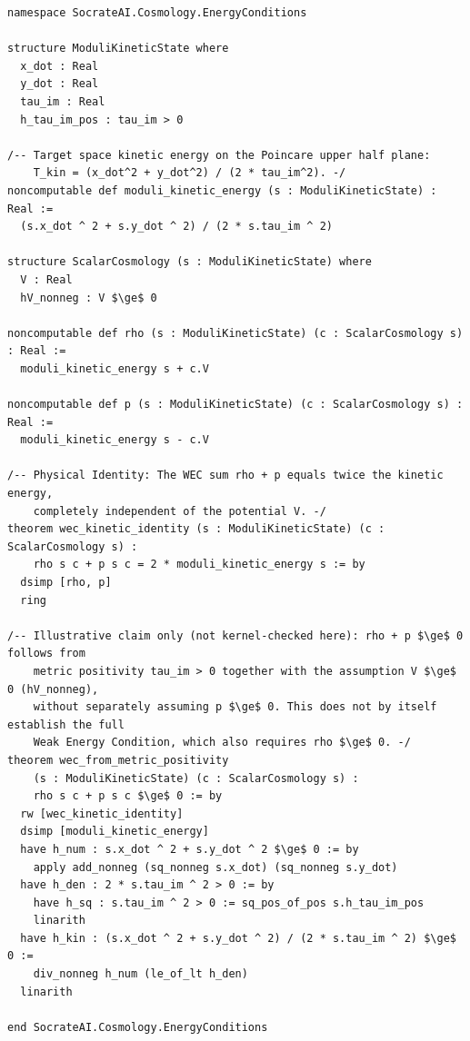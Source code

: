 \documentclass[11pt,a4paper]{article}
\begin{document}
\begin{lstlisting}[language=lean, caption={Illustrative Lean 4 pseudocode for the kinetic-decomposition identity (not a compiling or kernel-checked development in this repository)}]
namespace SocrateAI.Cosmology.EnergyConditions

structure ModuliKineticState where
  x_dot : Real
  y_dot : Real
  tau_im : Real
  h_tau_im_pos : tau_im > 0

/-- Target space kinetic energy on the Poincare upper half plane:
    T_kin = (x_dot^2 + y_dot^2) / (2 * tau_im^2). -/
noncomputable def moduli_kinetic_energy (s : ModuliKineticState) : Real :=
  (s.x_dot ^ 2 + s.y_dot ^ 2) / (2 * s.tau_im ^ 2)

structure ScalarCosmology (s : ModuliKineticState) where
  V : Real
  hV_nonneg : V $\ge$ 0

noncomputable def rho (s : ModuliKineticState) (c : ScalarCosmology s) : Real :=
  moduli_kinetic_energy s + c.V

noncomputable def p (s : ModuliKineticState) (c : ScalarCosmology s) : Real :=
  moduli_kinetic_energy s - c.V

/-- Physical Identity: The WEC sum rho + p equals twice the kinetic energy,
    completely independent of the potential V. -/
theorem wec_kinetic_identity (s : ModuliKineticState) (c : ScalarCosmology s) :
    rho s c + p s c = 2 * moduli_kinetic_energy s := by
  dsimp [rho, p]
  ring

/-- Illustrative claim only (not kernel-checked here): rho + p $\ge$ 0 follows from
    metric positivity tau_im > 0 together with the assumption V $\ge$ 0 (hV_nonneg),
    without separately assuming p $\ge$ 0. This does not by itself establish the full
    Weak Energy Condition, which also requires rho $\ge$ 0. -/
theorem wec_from_metric_positivity
    (s : ModuliKineticState) (c : ScalarCosmology s) :
    rho s c + p s c $\ge$ 0 := by
  rw [wec_kinetic_identity]
  dsimp [moduli_kinetic_energy]
  have h_num : s.x_dot ^ 2 + s.y_dot ^ 2 $\ge$ 0 := by
    apply add_nonneg (sq_nonneg s.x_dot) (sq_nonneg s.y_dot)
  have h_den : 2 * s.tau_im ^ 2 > 0 := by
    have h_sq : s.tau_im ^ 2 > 0 := sq_pos_of_pos s.h_tau_im_pos
    linarith
  have h_kin : (s.x_dot ^ 2 + s.y_dot ^ 2) / (2 * s.tau_im ^ 2) $\ge$ 0 :=
    div_nonneg h_num (le_of_lt h_den)
  linarith

end SocrateAI.Cosmology.EnergyConditions
\end{lstlisting}
\end{document}
